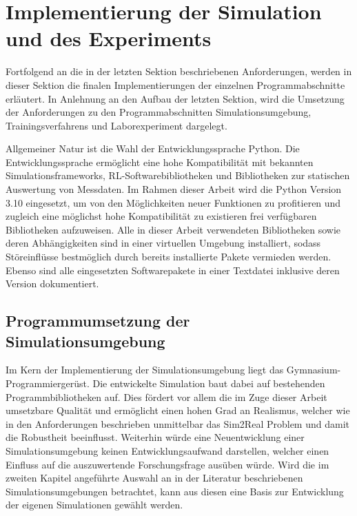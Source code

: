 \section{Implementierung der Simulation und des Experiments}

Fortfolgend an die in der letzten Sektion beschriebenen Anforderungen, werden in dieser Sektion die finalen Implementierungen der einzelnen Programmabschnitte erläutert.
In Anlehnung an den Aufbau der letzten Sektion, wird die Umsetzung der Anforderungen zu den Programmabschnitten Simulationsumgebung, Trainingsverfahrens und Laborexperiment dargelegt.

Allgemeiner Natur ist die Wahl der Entwicklungssprache Python.
Die Entwicklungssprache ermöglicht eine hohe Kompatibilität mit bekannten Simulationsframeworks, RL-Softwarebibliotheken und Bibliotheken zur statischen Auswertung von Messdaten.
Im Rahmen dieser Arbeit wird die Python Version 3.10 eingesetzt, um von den Möglichkeiten neuer Funktionen zu profitieren und zugleich eine möglichst hohe Kompatibilität zu existieren frei verfügbaren Bibliotheken aufzuweisen.
Alle in dieser Arbeit verwendeten Bibliotheken sowie deren Abhängigkeiten sind in einer virtuellen Umgebung installiert, sodass Störeinflüsse bestmöglich durch bereits installierte Pakete vermieden werden.
Ebenso sind alle eingesetzten Softwarepakete in einer Textdatei inklusive deren Version dokumentiert.

\subsection{Programmumsetzung der Simulationsumgebung}

Im Kern der Implementierung der Simulationsumgebung liegt das Gymnasium-Programmiergerüst.
Die entwickelte Simulation baut dabei auf bestehenden Programmbibliotheken auf.
Dies fördert vor allem die im Zuge dieser Arbeit umsetzbare Qualität und ermöglicht einen hohen Grad an Realismus, welcher wie in den Anforderungen beschrieben unmittelbar das Sim2Real Problem und damit die Robustheit beeinflusst.
Weiterhin würde eine Neuentwicklung einer Simulationsumgebung keinen Entwicklungsaufwand darstellen, welcher einen Einfluss auf die auszuwertende Forschungsfrage ausüben würde.
Wird die im zweiten Kapitel angeführte Auswahl an in der Literatur beschriebenen Simulationsumgebungen betrachtet, kann aus diesen eine Basis zur Entwicklung der eigenen Simulationen gewählt werden.

